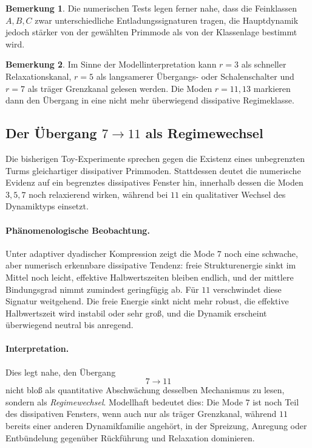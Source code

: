 \documentclass[11pt,a4paper]{article}
\theoremstyle{definition}
\newtheorem{bemerkung}{Bemerkung}
\begin{document}
\begin{bemerkung}
	Die numerischen Tests legen ferner nahe, dass die Feinklassen \(A,B,C\) zwar unterschiedliche Entladungssignaturen tragen, die Hauptdynamik jedoch stärker von der gewählten Primmode als von der Klassenlage bestimmt wird.
\end{bemerkung}

\begin{bemerkung}
	Im Sinne der Modellinterpretation kann \(r=3\) als schneller Relaxationskanal, \(r=5\) als langsamerer Übergangs- oder Schalenschalter und \(r=7\) als träger Grenzkanal gelesen werden. Die Moden \(r=11,13\) markieren dann den Übergang in eine nicht mehr überwiegend dissipative Regimeklasse.
\end{bemerkung}

\subsection{Der Übergang \(7\to 11\) als Regimewechsel}

Die bisherigen Toy-Experimente sprechen gegen die Existenz eines unbegrenzten Turms gleichartiger dissipativer Primmoden. Stattdessen deutet die numerische Evidenz auf ein begrenztes dissipatives Fenster hin, innerhalb dessen die Moden \(3,5,7\) noch relaxierend wirken, während bei \(11\) ein qualitativer Wechsel des Dynamiktyps einsetzt.

\paragraph{Phänomenologische Beobachtung.}
Unter adaptiver dyadischer Kompression zeigt die Mode \(7\) noch eine schwache, aber numerisch erkennbare dissipative Tendenz: freie Strukturenergie sinkt im Mittel noch leicht, effektive Halbwertszeiten bleiben endlich, und der mittlere Bindungsgrad nimmt zumindest geringfügig ab. Für \(11\) verschwindet diese Signatur weitgehend. Die freie Energie sinkt nicht mehr robust, die effektive Halbwertszeit wird instabil oder sehr groß, und die Dynamik erscheint überwiegend neutral bis anregend.

\paragraph{Interpretation.}
Dies legt nahe, den Übergang
\[
7\longrightarrow 11
\]
nicht bloß als quantitative Abschwächung desselben Mechanismus zu lesen, sondern als \emph{Regimewechsel}. Modellhaft bedeutet dies: Die Mode \(7\) ist noch Teil des dissipativen Fensters, wenn auch nur als träger Grenzkanal, während \(11\) bereits einer anderen Dynamikfamilie angehört, in der Spreizung, Anregung oder Entbündelung gegenüber Rückführung und Relaxation dominieren.
\end{document}
